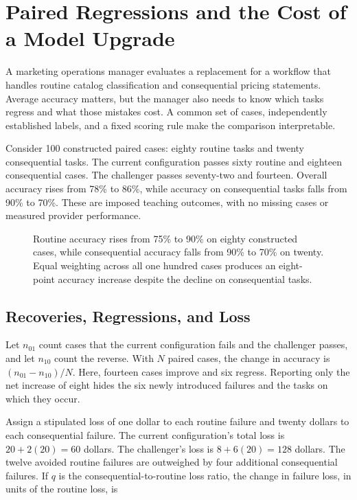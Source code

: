 \hypertarget{M07-paired-regressions-and-the-cost-of-a-model-upgrade}{%
\section{Paired Regressions and the Cost of a Model
Upgrade}\label{M07-paired-regressions-and-the-cost-of-a-model-upgrade}}

\noindent \noindent A marketing operations manager evaluates a replacement for a
workflow that handles routine catalog classification and consequential
pricing statements. Average accuracy matters, but the manager also needs
to know which tasks regress and what those mistakes cost. A common set
of cases, independently established labels, and a fixed scoring rule
make the comparison interpretable.

Consider 100 constructed paired cases: eighty routine tasks and twenty
consequential tasks. The current configuration passes sixty routine and
eighteen consequential cases. The challenger passes seventy-two and
fourteen. Overall accuracy rises from 78\% to 86\%, while accuracy on
consequential tasks falls from 90\% to 70\%. These are imposed teaching
outcomes, with no missing cases or measured provider performance.

\begin{figure}[htbp]
\centering

\caption{Routine accuracy rises from 75\% to 90\% on eighty constructed cases, while consequential accuracy falls from 90\% to 70\% on twenty. Equal weighting across all one hundred cases produces an eight-point accuracy increase despite the decline on consequential tasks.}\label{fig:M07_upgrade_segments}
\end{figure}

\hypertarget{M07-recoveries-regressions-and-loss}{%
\subsection{Recoveries, Regressions, and
Loss}\label{M07-recoveries-regressions-and-loss}}

\noindent \noindent Let \(n_{01}\) count cases that the current configuration
fails and the challenger passes, and let \(n_{10}\) count the reverse.
With \(N\) paired cases, the change in accuracy is
\((n_{01}-n_{10})/N\). Here, fourteen cases improve and six regress.
Reporting only the net increase of eight hides the six newly introduced
failures and the tasks on which they occur.

Assign a stipulated loss of one dollar to each routine failure and
twenty dollars to each consequential failure. The current
configuration's total loss is \(20+2(20)=60\) dollars. The challenger's
loss is \(8+6(20)=128\) dollars. The twelve avoided routine failures are
outweighed by four additional consequential failures. If \(q\) is the
consequential-to-routine loss ratio, the change in failure loss, in
units of the routine loss, is

